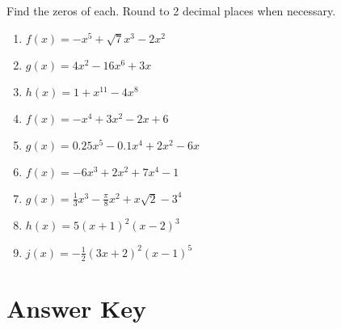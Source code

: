 Find the zeros of each. Round to 2 decimal places when necessary.
\begin{multicols}{3}
\begin{enumerate}	\setcounter{enumi}{\value{Review}}
\item $f(x) = -x^5 + \sqrt{7}x^3 - 2x^2$
\item $g(x) = 4x^2 - 16x^6 + 3x$
\item $h(x) = 1 + x^{11} - 4x^8$
\item $f(x) = -x^4+3x^2-2x+6$
\item $g(x) = 0.25x^5-0.1x^4+2x^2-6x$
\item $f(x) = -6x^3 + 2x^2 + 7x^4 - 1$
\item $g(x) = \frac{1}{3}x^3 - \frac{\pi}{8}x^2 + x\sqrt{2} - 3^4$
\item $h(x) = 5(x+1)^2(x-2)^3$
\item $j(x) = -\frac{1}{2}\left(3x+2\right)^2(x-1)^5$
\end{enumerate}	\setcounter{Review}{\value{enumi}}
\end{multicols}

\newpage

\section{Answer Key}

